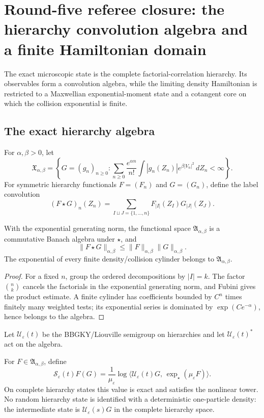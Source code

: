 \section{Round-five referee closure: the hierarchy convolution algebra and a finite Hamiltonian domain}
\label{sec:r5-b4}

The exact microscopic state is the complete factorial-correlation hierarchy.
Its observables form a convolution algebra, while the limiting density
Hamiltonian is restricted to a Maxwellian exponential-moment state and a
cotangent core on which the collision exponential is finite.

\subsection{The exact hierarchy algebra}

For \(\alpha,\beta>0\), let
\[
 {\mathfrak X}_{\alpha,\beta}
 =
 \left\{G=(g_n)_{n\ge0}:
 \sum_{n\ge0}\frac{e^{\alpha n}}{n!}
 \int |g_n(Z_n)|e^{\beta|V_n|^2}\,dZ_n<\infty\right\}.
\]
For symmetric hierarchy functionals \(F=(F_n)\) and \(G=(G_n)\), define the
label convolution
\[
 (F\star G)_n(Z_n)
 =
 \sum_{I\sqcup J=\{1,\ldots,n\}}
 F_{|I|}(Z_I)G_{|J|}(Z_J).
\]

\begin{lemma}
\label{lem:r5-b4-algebra}
With the exponential generating norm, the functional space
\({\mathfrak A}_{\alpha,\beta}\) is a commutative Banach algebra under
\(\star\), and
\[
 \|F\star G\|_{\alpha,\beta}
 \le\|F\|_{\alpha,\beta}\|G\|_{\alpha,\beta}.
\]
The exponential of every finite density/collision cylinder belongs to
\({\mathfrak A}_{\alpha,\beta}\).
\end{lemma}

\begin{proof}
For a fixed \(n\), group the ordered decompositions by \(|I|=k\).  The factor
\(\binom nk\) cancels the factorials in the exponential generating norm, and
Fubini gives the product estimate.  A finite cylinder has coefficients
bounded by \(C^n\) times finitely many weighted tests; its exponential series
is dominated by \(\exp(Ce^{-\alpha})\), hence belongs to the algebra.
\end{proof}

Let \({\mathscr U}_\varepsilon(t)\) be the BBGKY/Liouville semigroup on
hierarchies and let \({\mathscr U}_\varepsilon(t)^*\) act on the algebra.

\begin{theorem}
\label{thm:r5-b4-exact}
For \(F\in{\mathfrak A}_{\alpha,\beta}\), define
\[
 {\mathscr S}_\varepsilon(t)F(G)
 =
 \frac1{\mu_\varepsilon}
 \log\langle
 {\mathscr U}_\varepsilon(t)G,\,
 \exp_\star(\mu_\varepsilon F)
 \rangle.
\]
On complete hierarchy states this value is exact and satisfies the nonlinear
tower.  No random hierarchy state is identified with a deterministic
one-particle density: the intermediate state is
\({\mathscr U}_\varepsilon(s)G\) in the complete hierarchy space.
\end{theorem}


